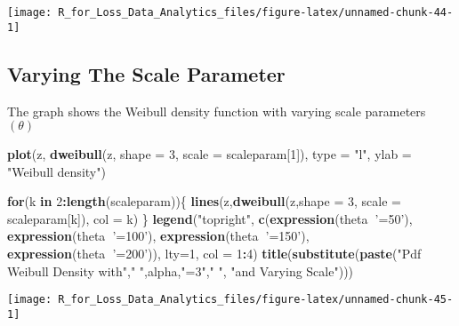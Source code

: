 \documentclass[]{book}
\newenvironment{Shaded}{\begin{snugshade}}{\end{snugshade}}
\newcommand{\KeywordTok}[1]{\textcolor[rgb]{0.13,0.29,0.53}{\textbf{#1}}}
\newcommand{\DataTypeTok}[1]{\textcolor[rgb]{0.13,0.29,0.53}{#1}}
\newcommand{\DecValTok}[1]{\textcolor[rgb]{0.00,0.00,0.81}{#1}}
\newcommand{\StringTok}[1]{\textcolor[rgb]{0.31,0.60,0.02}{#1}}
\newcommand{\ControlFlowTok}[1]{\textcolor[rgb]{0.13,0.29,0.53}{\textbf{#1}}}
\newcommand{\OperatorTok}[1]{\textcolor[rgb]{0.81,0.36,0.00}{\textbf{#1}}}
\newcommand{\NormalTok}[1]{#1}
\theoremstyle{definition}
\theoremstyle{definition}
\theoremstyle{definition}
\theoremstyle{remark}
\begin{document}
\begin{center}\texttt{[image: R\_for\_Loss\_Data\_Analytics\_files/figure-latex/unnamed-chunk-44-1]} \end{center}

\subsection{Varying The Scale
Parameter}\label{varying-the-scale-parameter-2}

The graph shows the Weibull density function with varying scale
parameters \((\theta)\)

\begin{Shaded}
\begin{Highlighting}[]
\KeywordTok{plot}\NormalTok{(z, }\KeywordTok{dweibull}\NormalTok{(z, }\DataTypeTok{shape =} \DecValTok{3}\NormalTok{, }\DataTypeTok{scale =}\NormalTok{ scaleparam[}\DecValTok{1}\NormalTok{]), }\DataTypeTok{type =} \StringTok{"l"}\NormalTok{, }\DataTypeTok{ylab =} \StringTok{"Weibull density"}\NormalTok{)}

\ControlFlowTok{for}\NormalTok{(k }\ControlFlowTok{in} \DecValTok{2}\OperatorTok{:}\KeywordTok{length}\NormalTok{(scaleparam))\{}
  \KeywordTok{lines}\NormalTok{(z,}\KeywordTok{dweibull}\NormalTok{(z,}\DataTypeTok{shape =} \DecValTok{3}\NormalTok{, }\DataTypeTok{scale =}\NormalTok{ scaleparam[k]), }\DataTypeTok{col =}\NormalTok{ k)}
\NormalTok{\}}
\KeywordTok{legend}\NormalTok{(}\StringTok{"topright"}\NormalTok{, }\KeywordTok{c}\NormalTok{(}\KeywordTok{expression}\NormalTok{(theta}\OperatorTok{~}\StringTok{'=50'}\NormalTok{), }\KeywordTok{expression}\NormalTok{(theta}\OperatorTok{~}\StringTok{'=100'}\NormalTok{), }\KeywordTok{expression}\NormalTok{(theta}\OperatorTok{~}\StringTok{'=150'}\NormalTok{), }\KeywordTok{expression}\NormalTok{(theta}\OperatorTok{~}\StringTok{'=200'}\NormalTok{)), }\DataTypeTok{lty=}\DecValTok{1}\NormalTok{, }\DataTypeTok{col =} \DecValTok{1}\OperatorTok{:}\DecValTok{4}\NormalTok{)}
\KeywordTok{title}\NormalTok{(}\KeywordTok{substitute}\NormalTok{(}\KeywordTok{paste}\NormalTok{(}\StringTok{"Pdf Weibull Density with"}\NormalTok{,}\StringTok{" "}\NormalTok{,alpha,}\StringTok{"=3"}\NormalTok{,}\StringTok{" "}\NormalTok{, }\StringTok{"and Varying Scale"}\NormalTok{)))}
\end{Highlighting}
\end{Shaded}

\begin{center}\texttt{[image: R\_for\_Loss\_Data\_Analytics\_files/figure-latex/unnamed-chunk-45-1]} \end{center}
\end{document}
